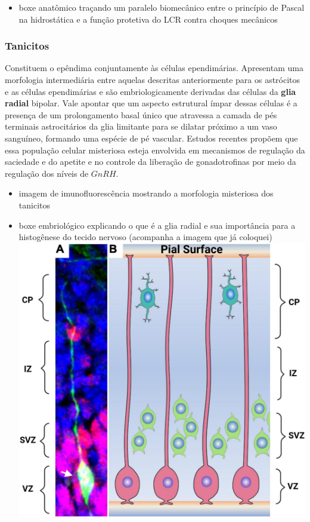 \documentclass[
]{book}
\providecommand{\tightlist}{%
  \setlength{\itemsep}{0pt}\setlength{\parskip}{0pt}}
\theoremstyle{definition}
\theoremstyle{definition}
\theoremstyle{definition}
\theoremstyle{definition}
\theoremstyle{remark}
\begin{document}
\begin{itemize}
\tightlist
\item
  boxe anatômico traçando um paralelo biomecânico entre o princípio de Pascal na hidrostática e a função protetiva do LCR contra choques mecânicos
\end{itemize}

\hypertarget{tanicitos}{%
\subsubsection*{Tanicitos}\label{tanicitos}}

Constituem o epêndima conjuntamente às células ependimárias. Apresentam uma morfologia intermediária entre aquelas descritas anteriormente para os astrócitos e as células ependimárias e são embriologicamente derivadas das células da \textbf{glia radial} bipolar. Vale apontar que um aspecto estrutural ímpar dessas células é a presença de um prolongamento basal único que atravessa a camada de pés terminais astrocitários da glia limitante para se dilatar próximo a um vaso sanguíneo, formando uma espécie de pé vascular. Estudos recentes propõem que essa população celular misteriosa esteja envolvida em mecanismos de regulação da saciedade e do apetite e no controle da liberação de gonadotrofinas por meio da regulação dos níveis de \(GnRH\).

\begin{itemize}
\item
  imagem de imunofluorescência mostrando a morfologia misteriosa dos tanicitos
\item
  boxe embriológico explicando o que é a glia radial e sua importância para a histogênese do tecido nervoso (acompanha a imagem que já coloquei)
  \includegraphics{images/neuro-radialglia.jpg}
\end{itemize}
\end{document}
